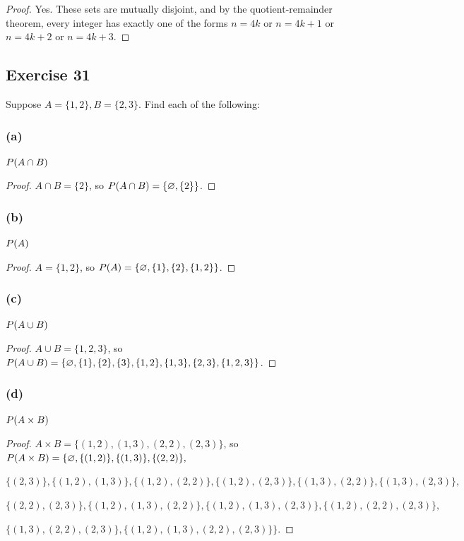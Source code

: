 \documentclass[14pt]{extarticle}
\let\mathscr\relax
\newcommand{\ps}{\mathscr{P}}
\newcommand{\es}{\varnothing}
\begin{document}
\begin{proof}
Yes. These sets are mutually disjoint, and by the quotient-remainder theorem, every integer has exactly one of the 
forms \(n = 4k\) or \(n = 4k+1\) or \(n = 4k+2\) or \(n = 4k+3\).
\end{proof}

\subsection{Exercise 31}
Suppose \(A = \{1, 2\}, B = \{2, 3\}\). Find each of the following:

\subsubsection{(a)}
\(\ps(A \cap B)\)

\begin{proof}
\(A \cap B = \{2\}\), so \(\ps(A \cap B) = \{\es, \{2\}\}\).
\end{proof}

\subsubsection{(b)}
\(\ps(A)\)

\begin{proof}
\(A = \{1, 2\}\), so \(\ps(A) = \{\es, \{1\}, \{2\}, \{1, 2\}\}\).
\end{proof}

\subsubsection{(c)}
\(\ps(A \cup B)\)

\begin{proof}
\(A \cup B = \{1, 2, 3\}\), so \(\ps(A \cup B) = \{\es, \{1\}, \{2\}, \{3\}, \{1, 2\}, \{1, 3\}, \{2, 3\}, \{1, 2, 3\}\}\).
\end{proof}

\subsubsection{(d)}
\(\ps(A \times B)\)

\begin{proof}
\(A \times B = \{(1, 2), (1, 3), (2, 2), (2, 3)\}\), so \(\ps(A\times B)=\{\es, \{(1, 2)\},\{(1, 3)\},\{(2, 2)\},\)

\(\{(2, 3)\}, \{(1, 2), (1, 3)\}, \{(1, 2), (2, 2)\}, \{(1, 2), (2, 3)\}, \{(1, 3), (2, 2)\}, \{(1, 3), (2, 3)\}, \)

\(\{(2, 2), (2, 3)\}, \{(1, 2), (1, 3), (2, 2)\}, \{(1, 2), (1, 3), (2, 3)\}, \{(1, 2), (2, 2), (2, 3)\}, \)

\(\{(1, 3), (2, 2), (2, 3)\}, \{(1, 2), (1, 3), (2, 2), (2, 3)\}\}\).
\end{proof}
\end{document}

